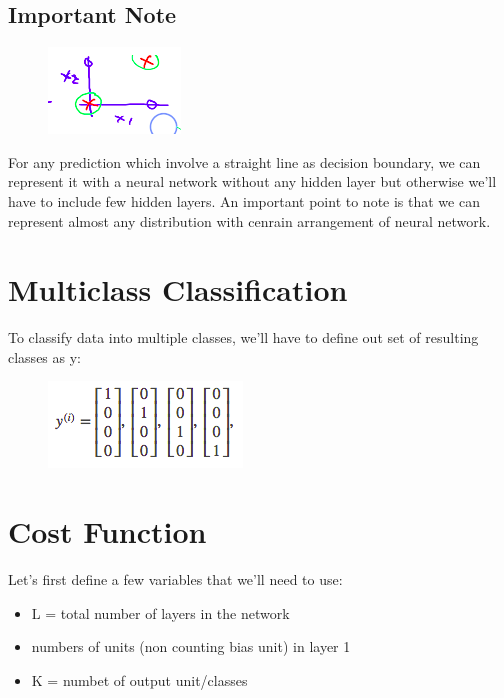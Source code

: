 \documentclass[12pt]{report}
\begin{document}
    \subsection{Important Note}
      \begin{figure}[h]
        \centering
        \includegraphics[scale=1]{important-net.png}
      \end{figure}

      For any prediction which involve a straight line as decision boundary, we can represent it with a neural network without any hidden layer but otherwise we'll have to include few hidden layers. An important point to note is that we can represent almost any distribution with cenrain arrangement of neural network.

  \section{Multiclass Classification}
    To classify data into multiple classes, we'll have to define out set of resulting classes as y:
    \begin{figure}[h]
      \centering
      \includegraphics[scale=0.6]{resultnet.png}
    \end{figure}

  \section{Cost Function}
    Let's first define a few variables that we'll need to use:
    
    \begin{itemize}
      \item L = total number of layers in the network
      \item numbers of units (non counting bias unit) in layer 1
      \item K = numbet of output unit/classes
    \end{itemize}
\end{document}
